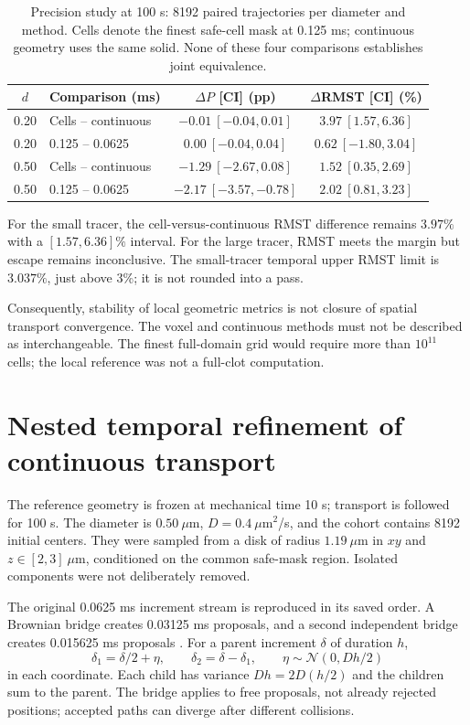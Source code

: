 \documentclass[a4paper,10pt]{article}
\numberwithin{equation}{section}
\begin{document}
\begin{table}[!htbp]
\centering\small
\setlength{\tabcolsep}{4pt}
\caption{Precision study at 100 s: 8192 paired trajectories per diameter and method. Cells denote the finest safe-cell mask at 0.125 ms; continuous geometry uses the same solid. None of these four comparisons establishes joint equivalence.}\label{tab:bridge}
\begin{tabular}{@{}clcc@{}}
\toprule
$d$ & Comparison (ms) & $\Delta P$ [CI] (pp) & $\Delta$RMST [CI] (\%) \\ \midrule
0.20 & Cells -- continuous & $-0.01\ [-0.04,0.01]$ & $3.97\ [1.57,6.36]$ \\
0.20 & 0.125 -- 0.0625 & $0.00\ [-0.04,0.04]$ & $0.62\ [-1.80,3.04]$ \\
0.50 & Cells -- continuous & $-1.29\ [-2.67,0.08]$ & $1.52\ [0.35,2.69]$ \\
0.50 & 0.125 -- 0.0625 & $-2.17\ [-3.57,-0.78]$ & $2.02\ [0.81,3.23]$ \\
\bottomrule
\end{tabular}
\end{table}

For the small tracer, the cell-versus-continuous RMST difference remains $3.97\%$ with a $[1.57,6.36]\%$ interval. For the large tracer, RMST meets the margin but escape remains inconclusive. The small-tracer temporal upper RMST limit is $3.037\%$, just above 3\%; it is not rounded into a pass.

Consequently, stability of local geometric metrics is not closure of spatial transport convergence. The voxel and continuous methods must not be described as interchangeable. The finest full-domain grid would require more than $10^{11}$ cells; the local reference was not a full-clot computation.

\clearpage
\section{Nested temporal refinement of continuous transport}
The reference geometry is frozen at mechanical time 10 s; transport is followed for 100 s. The diameter is $0.50~\mu$m, $D=0.4~\mu$m$^2$/s, and the cohort contains 8192 initial centers. They were sampled from a disk of radius $1.19~\mu$m in $xy$ and $z\in[2,3]~\mu$m, conditioned on the common safe-mask region. Isolated components were not deliberately removed.

The original 0.0625 ms increment stream is reproduced in its saved order. A Brownian bridge creates 0.03125 ms proposals, and a second independent bridge creates 0.015625 ms proposals \cite{IowaBrownianBridge}. For a parent increment $\delta$ of duration $h$,
\begin{equation}
\delta_1=\delta/2+\eta,\qquad
\delta_2=\delta-\delta_1,\qquad
\eta\sim\mathcal N(0,Dh/2)
\end{equation}
in each coordinate. Each child has variance $Dh=2D(h/2)$ and the children sum to the parent. The bridge applies to free proposals, not already rejected positions; accepted paths can diverge after different collisions.
\end{document}
